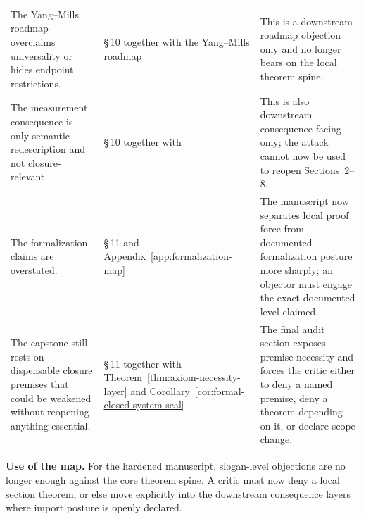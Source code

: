 \begin{longtable}{P{0.34\textwidth}P{0.28\textwidth}P{0.26\textwidth}}
The Yang--Mills roadmap overclaims universality or hides endpoint restrictions. & \S\,10 together with the Yang--Mills roadmap & This is a downstream roadmap objection only and no longer bears on the local theorem spine. \\
The measurement consequence is only semantic redescription and not closure-relevant. & \S\,10 together with \measurementdoc{} & This is also downstream consequence-facing only; the attack cannot now be used to reopen Sections~2--8. \\
The formalization claims are overstated. & \S\,11 and Appendix~\ref{app:formalization-map} & The manuscript now separates local proof force from documented formalization posture more sharply; an objector must engage the exact documented level claimed. \\
The capstone still rests on dispensable closure premises that could be weakened without reopening anything essential. & \S\,11 together with Theorem~\ref{thm:axiom-necessity-layer} and Corollary~\ref{cor:formal-closed-system-seal} & The final audit section exposes premise-necessity and forces the critic either to deny a named premise, deny a theorem depending on it, or declare scope change. \\
\end{longtable}

\begin{riskbox}
\textbf{Use of the map.} For the hardened manuscript, slogan-level objections are no longer enough against the core theorem spine. A critic must now deny a local section theorem, or else move explicitly into the downstream consequence layers where import posture is openly declared.
\end{riskbox}
